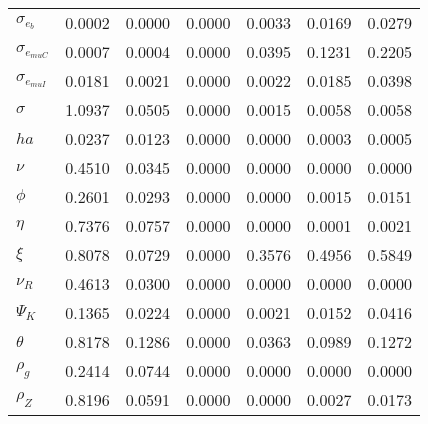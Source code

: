\begin{center}
\begin{longtable}{lcccccc}
$ \sigma_{{e_b}}       $	 & 	          0.0002	 & 	          0.0000	 & 	          0.0000	 & 	          0.0033	 & 	          0.0169	 & 	          0.0279 \\ 
$ \sigma_{{e_{muC}}}   $	 & 	          0.0007	 & 	          0.0004	 & 	          0.0000	 & 	          0.0395	 & 	          0.1231	 & 	          0.2205 \\ 
$ \sigma_{{e_{muI}}}   $	 & 	          0.0181	 & 	          0.0021	 & 	          0.0000	 & 	          0.0022	 & 	          0.0185	 & 	          0.0398 \\ 
$ {\sigma}             $	 & 	          1.0937	 & 	          0.0505	 & 	          0.0000	 & 	          0.0015	 & 	          0.0058	 & 	          0.0058 \\ 
$ {ha}                 $	 & 	          0.0237	 & 	          0.0123	 & 	          0.0000	 & 	          0.0000	 & 	          0.0003	 & 	          0.0005 \\ 
$ \nu                  $	 & 	          0.4510	 & 	          0.0345	 & 	          0.0000	 & 	          0.0000	 & 	          0.0000	 & 	          0.0000 \\ 
$ {\phi}               $	 & 	          0.2601	 & 	          0.0293	 & 	          0.0000	 & 	          0.0000	 & 	          0.0015	 & 	          0.0151 \\ 
$ {\eta}               $	 & 	          0.7376	 & 	          0.0757	 & 	          0.0000	 & 	          0.0000	 & 	          0.0001	 & 	          0.0021 \\ 
$ \xi                  $	 & 	          0.8078	 & 	          0.0729	 & 	          0.0000	 & 	          0.3576	 & 	          0.4956	 & 	          0.5849 \\ 
$ {\nu_R}              $	 & 	          0.4613	 & 	          0.0300	 & 	          0.0000	 & 	          0.0000	 & 	          0.0000	 & 	          0.0000 \\ 
$ {\Psi_{K}}           $	 & 	          0.1365	 & 	          0.0224	 & 	          0.0000	 & 	          0.0021	 & 	          0.0152	 & 	          0.0416 \\ 
$ {\theta}             $	 & 	          0.8178	 & 	          0.1286	 & 	          0.0000	 & 	          0.0363	 & 	          0.0989	 & 	          0.1272 \\ 
$ {\rho_g}             $	 & 	          0.2414	 & 	          0.0744	 & 	          0.0000	 & 	          0.0000	 & 	          0.0000	 & 	          0.0000 \\ 
$ {\rho_Z}             $	 & 	          0.8196	 & 	          0.0591	 & 	          0.0000	 & 	          0.0000	 & 	          0.0027	 & 	          0.0173 \\ 

\end{longtable}
\end{center}
